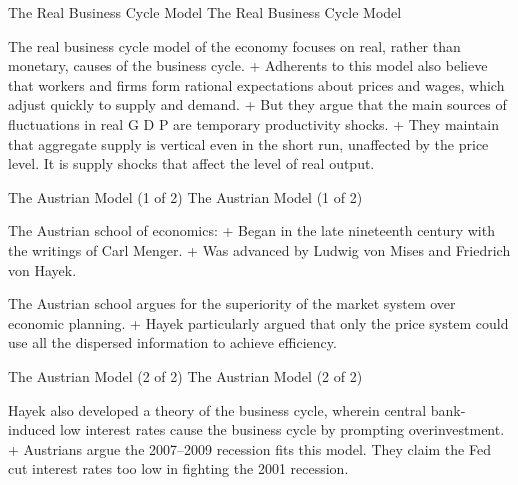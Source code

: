 \documentclass[
  12pt,
  ignorenonframetext,
]{beamer}
\begin{document}
\begin{frame}{The Real Business Cycle Model}
\protect\hypertarget{the-real-business-cycle-model}{}
The Real Business Cycle Model

The real business cycle model of the economy focuses on real, rather
than monetary, causes of the business cycle. + Adherents to this model
also believe that workers and firms form rational expectations about
prices and wages, which adjust quickly to supply and demand. + But they
argue that the main sources of fluctuations in real G D P are temporary
productivity shocks. + They maintain that aggregate supply is vertical
even in the short run, unaffected by the price level. It is supply
shocks that affect the level of real output.
\end{frame}

\begin{frame}{The Austrian Model (1 of 2)}
\protect\hypertarget{the-austrian-model-1-of-2}{}
The Austrian Model (1 of 2)

The Austrian school of economics: + Began in the late nineteenth century
with the writings of Carl Menger. + Was advanced by Ludwig von Mises and
Friedrich von Hayek.

The Austrian school argues for the superiority of the market system over
economic planning. + Hayek particularly argued that only the price
system could use all the dispersed information to achieve efficiency.
\end{frame}

\begin{frame}{The Austrian Model (2 of 2)}
\protect\hypertarget{the-austrian-model-2-of-2}{}
The Austrian Model (2 of 2)

Hayek also developed a theory of the business cycle, wherein central
bank-induced low interest rates cause the business cycle by prompting
overinvestment. + Austrians argue the 2007--2009 recession fits this
model. They claim the Fed cut interest rates too low in fighting the
2001 recession.
\end{frame}
\end{document}
